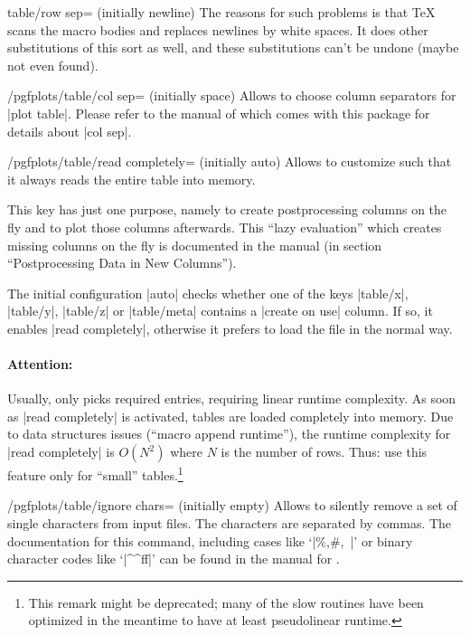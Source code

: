 {\begin{pgfplotskey}{table/row sep= (initially newline)}
    The reasons for such problems is that \TeX{} scans the macro bodies and
    replaces newlines by white spaces. It does other substitutions of this sort
    as well, and these substitutions can't be undone (maybe not even found).
\end{pgfplotskey}

\begin{key}{/pgfplots/table/col sep= (initially space)%
}
    Allows to choose column separators for |plot table|. Please refer to the
    manual of \PGFPlotstable{} which comes with this package for details about
    |col sep|.
\end{key}

\begin{key}{/pgfplots/table/read completely= (initially auto)}
    Allows to customize  such that it
    always reads the entire table into memory.

    This key has just one purpose, namely to create postprocessing columns on
    the fly and to plot those columns afterwards. This ``lazy evaluation''
    which creates missing columns on the fly is documented in the
    \PGFPlotstable{} manual (in section ``Postprocessing Data in New
    Columns'').

    The initial configuration |auto| checks whether one of the keys |table/x|,
    |table/y|, |table/z| or |table/meta| contains a |create on use| column. If
    so, it enables |read completely|, otherwise it prefers to load the file in
    the normal way.


    \paragraph{Attention:}

    Usually,  only picks required entries, requiring
    linear runtime complexity. As soon as |read completely| is activated,
    tables are loaded completely into memory. Due to data structures issues
    (``macro append runtime''), the runtime complexity for |read completely| is
    $O(N^2)$ where $N$ is the number of rows. Thus: use this feature only for
    ``small'' tables.\footnote{This remark might be deprecated; many of the slow
    routines have been optimized in the meantime to have at least pseudolinear
    runtime.}
\end{key}

\begin{key}{/pgfplots/table/ignore chars= (initially empty)}
    Allows to silently remove a set of single characters from input files. The
    characters are separated by commas. The documentation for this command,
    including cases like `|\%,\#,\ |' or binary character codes like `|\^^ff|'
    can be found in the manual for \PGFPlotstable{}.


\end{key}}
